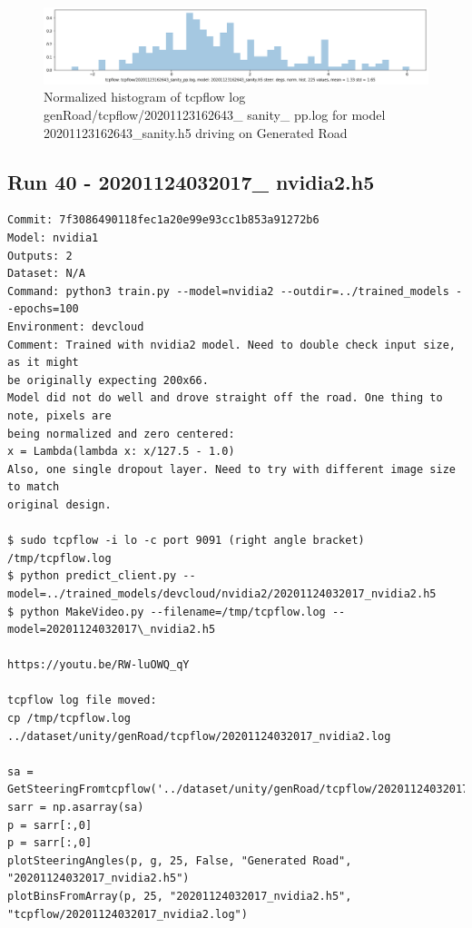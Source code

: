 \begin{figure}[ht]
 \centering 
 \includegraphics[width=\textwidth]{Figures/tcpflow_20201123162643_sanity_pp_bins.png}
 \caption{Normalized histogram of tcpflow log genRoad/tcpflow/20201123162643\_ sanity\_ pp.log for model 20201123162643\_sanity.h5 driving on Generated Road}
 \label{fig:tcpflow_20201123162643_pp_bins} 
\end{figure} 

\subsection{Run 40 - 20201124032017\_ nvidia2.h5}
\begin{verbatim}
Commit: 7f3086490118fec1a20e99e93cc1b853a91272b6
Model: nvidia1
Outputs: 2
Dataset: N/A
Command: python3 train.py --model=nvidia2 --outdir=../trained_models --epochs=100
Environment: devcloud
Comment: Trained with nvidia2 model. Need to double check input size, as it might
be originally expecting 200x66.
Model did not do well and drove straight off the road. One thing to note, pixels are
being normalized and zero centered:
x = Lambda(lambda x: x/127.5 - 1.0)
Also, one single dropout layer. Need to try with different image size to match
original design.

$ sudo tcpflow -i lo -c port 9091 (right angle bracket) /tmp/tcpflow.log
$ python predict_client.py --model=../trained_models/devcloud/nvidia2/20201124032017_nvidia2.h5
$ python MakeVideo.py --filename=/tmp/tcpflow.log --model=20201124032017\_nvidia2.h5

https://youtu.be/RW-luOWQ_qY

tcpflow log file moved:
cp /tmp/tcpflow.log ../dataset/unity/genRoad/tcpflow/20201124032017_nvidia2.log

sa = GetSteeringFromtcpflow('../dataset/unity/genRoad/tcpflow/20201124032017_nvidia2.log)
sarr = np.asarray(sa)
p = sarr[:,0]
p = sarr[:,0]  
plotSteeringAngles(p, g, 25, False, "Generated Road", "20201124032017_nvidia2.h5")
plotBinsFromArray(p, 25, "20201124032017_nvidia2.h5", "tcpflow/20201124032017_nvidia2.log")
\end{verbatim}

